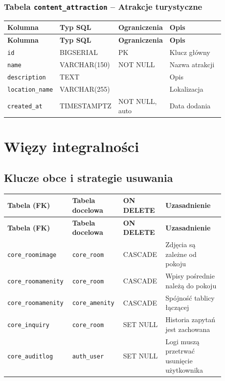 \documentclass[12pt,a4paper]{article}
\begin{document}
\subsubsection*{Tabela \texttt{content\_attraction} -- Atrakcje turystyczne}

\begin{longtable}{p{0.22\linewidth}p{0.18\linewidth}p{0.15\linewidth}p{0.33\linewidth}}
\toprule
\textbf{Kolumna} & \textbf{Typ SQL} & \textbf{Ograniczenia} & \textbf{Opis} \\
\midrule
\endfirsthead
\toprule
\textbf{Kolumna} & \textbf{Typ SQL} & \textbf{Ograniczenia} & \textbf{Opis} \\
\midrule
\endhead
\texttt{id} & BIGSERIAL & PK & Klucz główny \\
\texttt{name} & VARCHAR(150) & NOT NULL & Nazwa atrakcji \\
\texttt{description} & TEXT & & Opis \\
\texttt{location\_name} & VARCHAR(255) & & Lokalizacja \\
\texttt{created\_at} & TIMESTAMPTZ & NOT NULL, auto & Data dodania \\
\bottomrule
\end{longtable}

\section{Więzy integralności}

\subsection{Klucze obce i strategie usuwania}

\begin{longtable}{p{0.22\linewidth}p{0.22\linewidth}p{0.18\linewidth}p{0.26\linewidth}}
\toprule
\textbf{Tabela (FK)} & \textbf{Tabela docelowa} & \textbf{ON DELETE} & \textbf{Uzasadnienie} \\
\midrule
\endfirsthead
\toprule
\textbf{Tabela (FK)} & \textbf{Tabela docelowa} & \textbf{ON DELETE} & \textbf{Uzasadnienie} \\
\midrule
\endhead
\texttt{core\_roomimage} & \texttt{core\_room} & CASCADE & Zdjęcia są zależne od pokoju \\
\texttt{core\_roomamenity} & \texttt{core\_room} & CASCADE & Wpisy pośrednie należą do pokoju \\
\texttt{core\_roomamenity} & \texttt{core\_amenity} & CASCADE & Spójność tablicy łączącej \\
\texttt{core\_inquiry} & \texttt{core\_room} & SET NULL & Historia zapytań jest zachowana \\
\texttt{core\_auditlog} & \texttt{auth\_user} & SET NULL & Logi muszą przetrwać usunięcie użytkownika \\
\bottomrule
\end{longtable}
\end{document}
